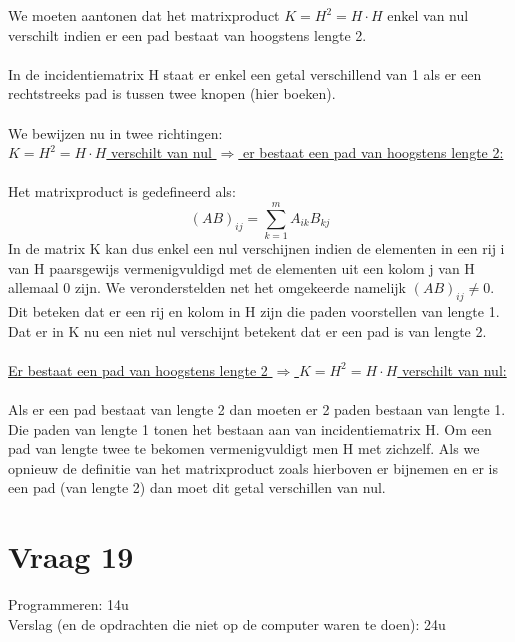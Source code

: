 \documentclass[11pt,a4paper]{article}
\begin{document}
We moeten aantonen dat het matrixproduct $K = H^2 = H\cdot H$ enkel van nul verschilt indien er een pad bestaat van hoogstens lengte 2.
\\
\\
In de incidentiematrix H staat er enkel een getal verschillend van 1 als er een rechtstreeks pad is tussen twee knopen (hier boeken).
\\
\\
We bewijzen nu in twee richtingen:\\
\underline{$K = H^2 = H\cdot H$ verschilt van nul $\Rightarrow$ er bestaat een pad van hoogstens lengte 2:}
\\
\\
Het matrixproduct is gedefineerd als:
$$(AB)_{ij} = \sum_{k=1}^mA_{ik}B_{kj}$$
In de matrix K kan dus enkel een nul verschijnen indien de elementen in een rij i van H paarsgewijs vermenigvuldigd met de elementen uit een kolom j van H allemaal 0 zijn. We veronderstelden net het omgekeerde namelijk $(AB)_{ij} \neq 0$. Dit beteken dat er een rij en kolom in H zijn die paden voorstellen van lengte 1. Dat er in K nu een niet nul verschijnt betekent dat er een pad is van lengte 2.
\\
\\
\underline{Er bestaat een pad van hoogstens lengte 2 $\Rightarrow$ $K = H^2 = H\cdot H$ verschilt van nul:}
\\
\\
Als er een pad bestaat van lengte 2 dan moeten er 2 paden bestaan van lengte 1. Die paden van lengte 1 tonen het bestaan aan van incidentiematrix H. Om een pad van lengte twee te bekomen vermenigvuldigt men H met zichzelf. Als we opnieuw de definitie van het matrixproduct zoals hierboven er bijnemen en er is een pad (van lengte 2) dan moet dit getal verschillen van nul.

\section*{Vraag 19}
Programmeren: 14u\\
Verslag (en de opdrachten die niet op de computer waren te doen): 24u 
\end{document}
